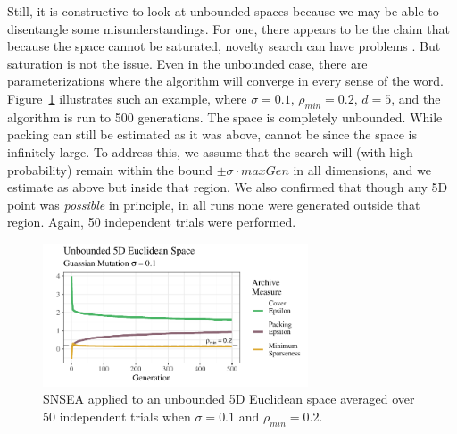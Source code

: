 \documentclass[twoside]{article}
\begin{document}
Still, it is constructive to look at unbounded spaces because we may be able to disentangle some misunderstandings.  For one, there appears to be the claim that because the space cannot be saturated, novelty search can have problems \citep{LehmanStanley2008ssls,Doncieux2019gecco}.  But saturation is not the issue.  Even in the unbounded case, there are parameterizations where the algorithm will converge in every sense of the word.  Figure~\ref{fig:unbounded:nopop:0102} illustrates such an example, where $\sigma=0.1$, $\rho_{min}= 0.2$, $d=5$, and the algorithm is run to 500 generations.  The space is completely unbounded.  While packing can still be estimated as it was above,  cannot be since the space is infinitely large.  To address this, we assume that the search will (with high probability) remain within the bound $\pm\sigma\cdot maxGen$ in all dimensions, and we estimate  as above but inside that region.  We also confirmed that though any 5D point was \emph{possible} in principle, in all runs none were generated outside that region.  Again, 50 independent trials were performed.
%
\begin{figure}[h]
  \center\includegraphics[width=0.7\textwidth]{Figures/unbounded-s01-r02-NOPOP.pdf}
  \caption{\label{fig:unbounded:nopop:0102} SNSEA applied to an unbounded 5D Euclidean space averaged over 50 independent trials when $\sigma=0.1$ and $\rho_{min}=0.2$.}
\end{figure}
\end{document}
